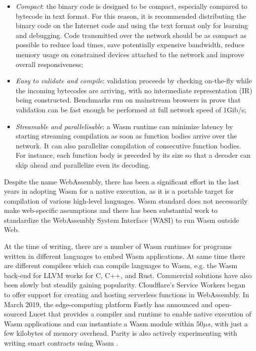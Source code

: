 \begin{itemize}
    \item \emph{Compact}: the binary code is designed to be compact, especially compared to bytecode in text format. For this reason, it is recommended distributing the binary code on the Internet code and using the text format only for learning and debugging. Code transmitted over the network should be as compact as possible to reduce load times, save potentially expensive bandwidth, reduce memory usage on constrained devices attached to the network and improve overall responsiveness;
    \item \emph{Easy to validate and compile}: validation proceeds by checking on-the-fly while the incoming bytecodes are arriving, with no intermediate representation (IR) being constructed. Benchmarks run on mainstream browsers in \cite{wasm} prove that validation can be fast enough be performed at full network speed of 1Gib/s;
    \item \emph{Streamable and parallelisable}: a Wasm runtime can minimize latency by starting streaming compilation as soon as function bodies arrive over the network. It can also parallelize compilation of consecutive function bodies. For instance, each function body is preceded by its size so that a decoder can skip ahead and parallelize even its decoding.
\end{itemize}

Despite the name WebAssembly, there has been a significant effort in the last years in adopting Wasm for a native execution, as it is a portable target for compilation of various high-level languages. Wasm standard does not necessarily make web-specific assumptions and there has been substantial work to standardize the WebAssembly System Interface (WASI) to run Wasm outside Web.

At the time of writing, there are a number of Wasm runtimes for programs written in different languages to embed Wasm applications. At same time there are different compilers which can compile languages to Wasm, e.g. the Wasm back-end for LLVM \cite{llvm} works for C, C++, and Rust. Commercial solutions have also been slowly but steadily gaining popularity. Cloudflare's Service Workers \cite{cloudflare-workers} began to offer support for creating and hosting serverless functions in WebAssembly. In March 2019, the edge-computing platform Fastly has announced and open-sourced Lucet \cite{fastly-lucet} that provides a compiler and runtime to enable native execution of Wasm applications and can instantiate a Wasm module within $50\mu s$, with just a few kilobytes of memory overhead. Parity is also actively experimenting with writing smart contracts using Wasm \cite{parity-wasm}.

